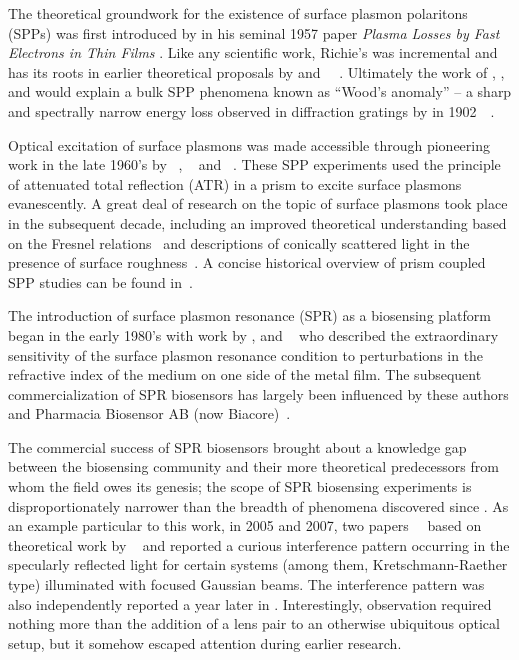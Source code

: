 The theoretical groundwork for the existence of surface plasmon polaritons
(SPPs) was first introduced by  in his seminal 1957 paper
\textit{Plasma Losses by Fast Electrons in Thin Films}
\cite{ritchie1957plasma}.  Like any scientific work, Richie's was
incremental and has its roots in earlier theoretical proposals by
 and
~\cite{bohm1951collective}~\cite{pines1952collective}.
Ultimately the work of , , and  would
explain a bulk SPP phenomena known as ``Wood's anomaly'' -- a sharp and
spectrally narrow energy loss observed in diffraction gratings by
 in
1902~\cite{wood1902remarkable}~\cite{rayleigh1907remarkable}.

Optical excitation of surface plasmons was made accessible through
pioneering work in the late 1960's by
~\cite{kretschmann1968},
~\cite{raether1988springer} and
~\cite{otto1968excitation}.  These SPP experiments used the
principle of attenuated total reflection (ATR) in a prism to excite surface
plasmons evanescently.  A great deal of research on the topic of surface
plasmons took place in the subsequent decade, including an improved
theoretical understanding based on the Fresnel
relations~\cite{chen1976excitation} and descriptions of conically scattered
light in the presence of surface roughness~\cite{simon1976directional}.  A
concise historical overview of prism coupled SPP studies can be found
in~\cite{raether1997surface}.

The introduction of surface plasmon resonance (SPR) as a biosensing
platform began in the early 1980's with work by ,
 and ~\cite{liedberg1983surface} who
described the extraordinary sensitivity of the surface plasmon resonance
condition to perturbations in the refractive index of the medium on one
side of the metal film.  The subsequent commercialization of SPR biosensors
has largely been influenced by these authors and Pharmacia Biosensor AB
(now Biacore)~\cite{liedberg1995biosensing}.

The commercial success of SPR biosensors brought about a knowledge gap
between the biosensing community and their more theoretical predecessors
from whom the field owes its genesis; the scope of SPR biosensing
experiments is disproportionately narrower than the breadth of phenomena
discovered since .  As an example particular to this work, in
2005 and 2007, two
papers~\cite{andaloro2005optical}~\cite{simon2007observation} based on
theoretical work by ~\cite{chuang1986lateral} and 
\cite{chen1976excitation} reported a curious interference pattern occurring
in the specularly reflected light for certain systems (among them,
Kretschmann-Raether type) illuminated with focused Gaussian beams.  The
interference pattern was also independently reported a year later in
\cite{schumann2008near}.  Interestingly, observation required nothing more
than the addition of a lens pair to an otherwise ubiquitous optical setup,
but it somehow escaped attention during earlier research.  

